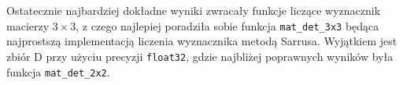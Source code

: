 \documentclass[11pt,a4paper]{article}
\begin{document}
Ostatecznie najbardziej dokładne wyniki zwracały funkcje liczące
wyznacznik macierzy $3\times3$, z czego najlepiej poradziła sobie
funkcja \verb|mat_det_3x3| będąca najprostszą implementacją
liczenia wyznacznika metodą Sarrusa. Wyjątkiem jest zbiór D przy
użyciu precyzji \verb|float32|, gdzie najbliżej poprawnych wyników była
funkcja \verb|mat_det_2x2|.
\end{document}
